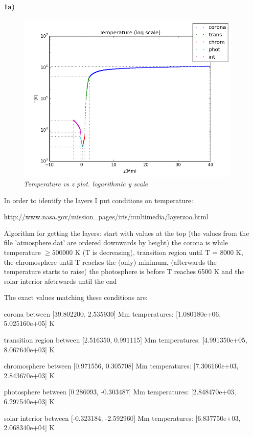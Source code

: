\documentclass[10pt]{book}
\begin{document}
\paragraph {1a)} 
\begin{figure}[H]
 \centering
 \includegraphics[scale=0.5]{tempLayers.png}
 \caption{\emph{Temperature vs z plot. logarithmic y scale}}
\end{figure}

In order to identify the layers I put conditions on temperature:

\url{http://www.nasa.gov/mission_pages/iris/multimedia/layerzoo.html}

Algorithm for getting the layers:
start with values at the top (the values from the  file 'atmosphere.dat' are ordered downwards by height) 
the corona is while temperature $\ge 500000$ K (T is decreasing), 
transition region until T = 8000 K, the chromosphere until T reaches the (only) minimum, (afterwards the temperature starts to raise) the photosphere  is before T reaches 6500 K and  the solar interior afetrwards until the end

The exact values matching these conditions are: 
\begin{description}

\item corona between [39.802200, 2.535930] Mm temperatures: [1.080180e+06, 5.025160e+05] K 
\item transition region between [2.516350, 0.991115] Mm temperatures: [4.991350e+05, 8.067640e+03] K  
\item chromosphere between [0.971556, 0.305708] Mm temperatures: [7.306160e+03, 2.843670e+03] K 
\item photosphere between [0.286093, -0.303487] Mm temperatures: [2.848470e+03, 6.297540e+03] K 
\item solar interior between [-0.323184, -2.592960] Mm temperatures: [6.837750e+03, 2.068340e+04] K 

\end{description}
\end{document}
